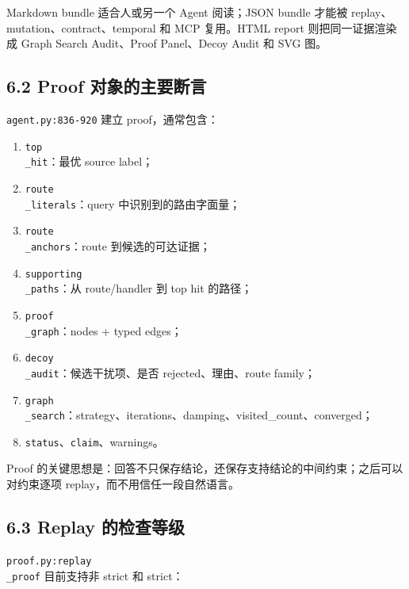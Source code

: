 \documentclass[UTF8,12pt,openany]{ctexbook}
\begin{document}
Markdown bundle 适合人或另一个 Agent 阅读；JSON bundle 才能被 replay、mutation、contract、temporal 和 MCP 复用。HTML report 则把同一证据渲染成 Graph Search Audit、Proof Panel、Decoy Audit 和 SVG 图。\par

\subsection{6.2 Proof 对象的主要断言}

\texttt{agent.py:836-920} 建立 proof，通常包含：\par

\begin{enumerate}
\item \texttt{top\\_hit}：最优 source label；
\item \texttt{route\\_literals}：query 中识别到的路由字面量；
\item \texttt{route\\_anchors}：route 到候选的可达证据；
\item \texttt{supporting\\_paths}：从 route/handler 到 top hit 的路径；
\item \texttt{proof\\_graph}：nodes + typed edges；
\item \texttt{decoy\\_audit}：候选干扰项、是否 rejected、理由、route family；
\item \texttt{graph\\_search}：strategy、iterations、damping、visited\_count、converged；
\item \texttt{status}、\texttt{claim}、warnings。
\end{enumerate}

Proof 的关键思想是：回答不只保存结论，还保存支持结论的中间约束；之后可以对约束逐项 replay，而不用信任一段自然语言。\par

\subsection{6.3 Replay 的检查等级}

\texttt{proof.py:replay\\_proof} 目前支持非 strict 和 strict：\par
\end{document}
